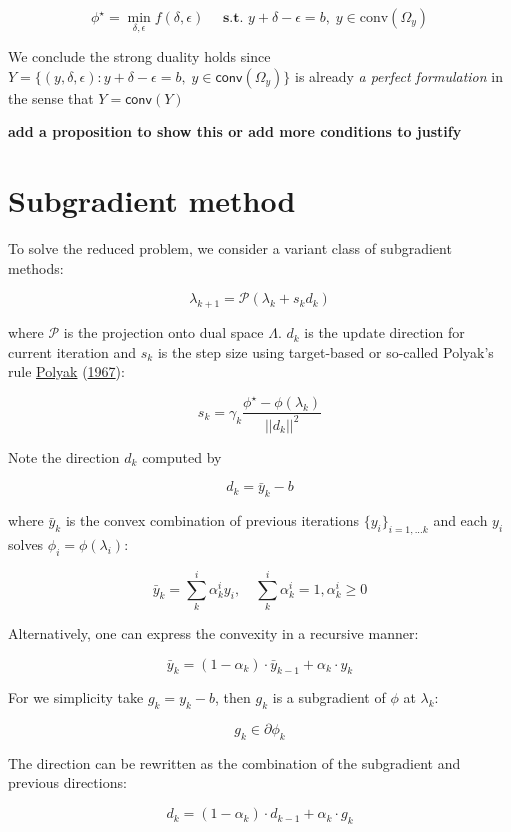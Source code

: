 \documentclass[
  a4paper,
,tablecaptionabove
]{scrartcl}
\numberwithin{equation}{section}
\begin{document}
\[ \phi^\star = \min_{\delta, \epsilon} f(\delta, \epsilon)\quad \textbf{ s.t. }  y + \delta - \epsilon = b,\; y \in \textrm{conv}(\Omega_y)\]

We conclude the strong duality holds since
\(Y = \{(y, \delta, \epsilon): y + \delta - \epsilon = b,\; y \in \textsf{conv}(\Omega_y)\}\)
is already \emph{a perfect formulation} in the sense that
\(Y = \textsf{conv}(Y)\)

\textbf{add a proposition to show this or add more conditions to
  justify}

\hypertarget{sec:subgradient-method}{%
  \section{Subgradient method}\label{subgradient-method}}

To solve the reduced problem, we consider a variant class of subgradient
methods:

\[\lambda_{k+1} = \mathcal{P}(\lambda_{k} + s_{k}d_{k})\]

where \(\mathcal P\) is the projection onto dual space \(\Lambda\).
\(d_k\) is the update direction for current iteration and \(s_{k}\) is
the step size using target-based or so-called Polyak's rule
\protect\hyperlink{ref-polyak_general_1967}{Polyak}
(\protect\hyperlink{ref-polyak_general_1967}{1967}):

\[s_{k} = \gamma_k\frac{\phi^\star - \phi(\lambda_k)}{||d_{k}||^2}\]

Note the direction \(d_k\) computed by

\[d_k = \bar y_k - b\]

where \(\bar y_k\) is the convex combination of previous iterations
\(\{y_i\}_{i=1,...k}\) and each \(y_i\) solves
\(\phi_i = \phi(\lambda_i)\):

\[\bar y_k = \sum^i_k \alpha^i_k y_i,\quad  \sum^i_k \alpha^i_k = 1, \alpha^i_k \ge 0\]

Alternatively, one can express the convexity in a recursive manner:

\[\bar y_k = (1-\alpha_k)\cdot\bar y_{k-1} + \alpha_k \cdot y_k \]

For we simplicity take \(g_k= y_k - b\), then \(g_k\) is a subgradient
of \(\phi\) at \(\lambda_k\):

\[g_k \in \partial \phi_k\]

The direction can be rewritten as the combination of the subgradient and
previous directions:

\[d_k = (1-\alpha_k) \cdot d_{k-1} + \alpha_k\cdot g_k\]
\end{document}
